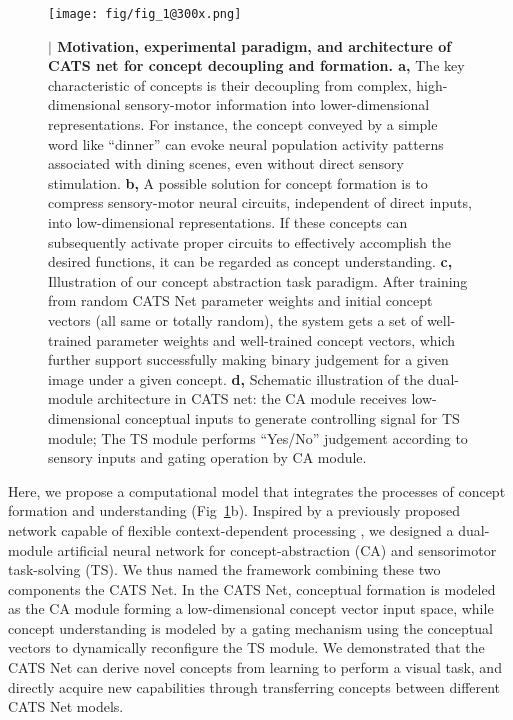 \documentclass[pdflatex,sn-mathphys-num,lineno]{sn-jnl}%
\begin{document}
\begin{CJK}{UTF8}{gbsn}
\begin{figure}[htbp]
\centering
\texttt{[image: fig/fig\_1@300x.png]}
\caption{\textbf{$\vert$ Motivation, experimental paradigm, and architecture of CATS net for concept decoupling and  formation. a,} The key characteristic of concepts is their decoupling from complex, high-dimensional sensory-motor information into lower-dimensional representations. For instance, the concept conveyed by a simple word like “dinner” can evoke neural population activity patterns associated with dining scenes, even without direct sensory stimulation. \textbf{b,}  A possible solution for concept formation is to compress sensory-motor neural circuits, independent of direct inputs, into low-dimensional representations. If these concepts can subsequently activate proper circuits to effectively accomplish the desired functions, it can be regarded as concept understanding. \textbf{c,} Illustration of our concept abstraction task paradigm. After training from random CATS Net parameter weights and initial concept vectors (all same or totally random), the system gets a set of well-trained parameter weights and well-trained concept vectors, which further support successfully making binary judgement for a given image under a given concept. \textbf{d,} Schematic illustration of the dual-module architecture in CATS net: the CA module receives low-dimensional conceptual inputs to generate controlling signal for TS module; The TS module performs “Yes/No” judgement according to sensory inputs and gating operation by CA module.}
\label{fig1}
\end{figure}

Here, we propose a computational model that integrates the processes of concept formation and understanding (Fig~\ref{fig1}b). Inspired by a previously proposed network capable of flexible context-dependent processing \cite{zeng_continual_2019}, we designed a dual-module artificial neural network for concept-abstraction (CA) and sensorimotor task-solving (TS). We thus named the framework combining these two components the CATS Net. In the CATS Net, conceptual formation is modeled as the CA module forming a low-dimensional concept vector input space, while concept understanding is modeled by a gating mechanism using the conceptual vectors to dynamically reconfigure the TS module. We demonstrated that the CATS Net can derive novel concepts from learning to perform a visual task, and directly acquire new capabilities through transferring concepts between different CATS Net models.


\end{CJK}
\end{document}
